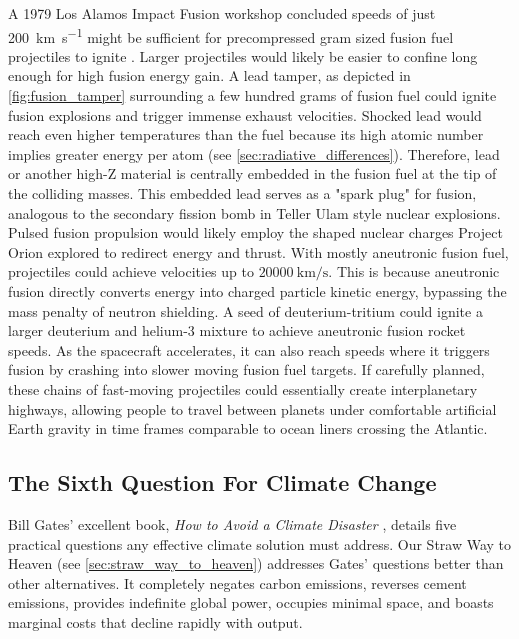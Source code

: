\documentclass{article}
\begin{document}
A 1979 Los Alamos Impact Fusion workshop concluded speeds of just \SI{200}{\kilo\meter\per\second} might be sufficient for precompressed gram sized fusion fuel projectiles to ignite \cite{impactfusion1979}.   Larger projectiles would likely be easier to confine long enough for high fusion energy gain.   A lead tamper, as depicted in \autoref{fig:fusion_tamper} surrounding a few hundred grams of fusion fuel could ignite fusion explosions and trigger immense exhaust velocities.  Shocked lead would reach even higher temperatures than the fuel because its high atomic number implies greater energy per atom (see \autoref{sec:radiative_differences}).  Therefore, lead or another high-Z material is centrally embedded in the fusion fuel at the tip of the colliding masses. This embedded lead serves as a "spark plug" for fusion, analogous to the secondary fission bomb in Teller Ulam style \cite{WikipediaThermonuclearWeapon} nuclear explosions.   Pulsed fusion propulsion would likely employ the shaped nuclear charges Project Orion explored to redirect energy and thrust.  
With mostly aneutronic fusion fuel, projectiles could achieve velocities up to $\SI{20000}{\kilo\meter\per\second}$.  This is because aneutronic fusion directly converts energy into charged particle kinetic energy, bypassing the mass penalty of neutron shielding.  A seed of deuterium-tritium could ignite a larger deuterium and helium-3 mixture to achieve aneutronic fusion rocket speeds.   As the spacecraft accelerates, it can also reach speeds where it triggers fusion by crashing into slower moving fusion fuel targets.   If carefully planned, these chains of fast-moving projectiles could essentially create interplanetary highways, allowing people to travel between planets under comfortable artificial Earth gravity in time frames comparable to ocean liners crossing the Atlantic.  

\subsection{The Sixth Question For Climate Change}\label{sec:sith_question}
Bill Gates' excellent book, \textit{How to Avoid a Climate Disaster} \cite{gates2021avoid}, details five practical questions \cite{breakthroughenergy_2021_five} any effective climate solution must address. Our Straw Way to Heaven (see \autoref{sec:straw_way_to_heaven}) addresses Gates' questions better than other alternatives. It completely negates carbon emissions, reverses cement emissions, provides indefinite global power, occupies minimal space, and boasts marginal costs that decline rapidly with output.
\end{document}

